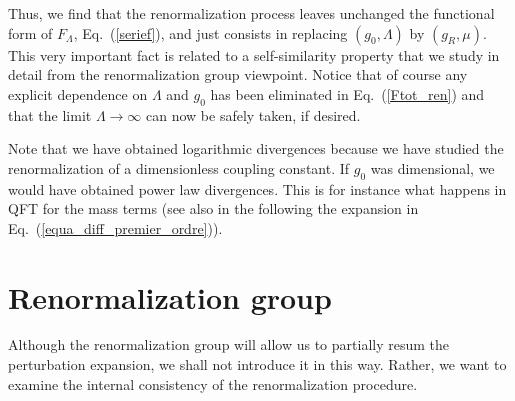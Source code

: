 \documentclass[floatfix,preprintnumbers,amsmath,amssymb,prb,12pt]{revtex4-1}
\begin{document}
Thus, we find that the renormalization process leaves unchanged
the functional form of $F_{\Lambda}$, Eq.~(\ref{serief}), and just consists in replacing
$(g_0,\Lambda)$ by $(g_R,\mu)$. This very important fact is
related to a self-similarity property that we study in detail from
the renormalization group viewpoint. Notice that of course any
explicit dependence on $\Lambda$ and $g_0$ has been eliminated in
Eq.~(\ref{Ftot_ren}) and that the limit $\Lambda\to\infty$ can now
be safely taken, if desired.

Note that we have obtained logarithmic divergences because we have
studied the renormalization of a dimensionless coupling constant.
If $g_0$ was dimensional, we would have obtained power law
divergences. This is for instance what happens in QFT for the mass
terms (see also in the following the expansion in
Eq.~(\ref{equa_diff_premier_ordre})).

\section{Renormalization group}
Although the renormalization group will allow us to partially
resum the perturbation expansion, we shall not introduce it in
this way. Rather, we want to examine the internal consistency of
the renormalization procedure.
\end{document}
